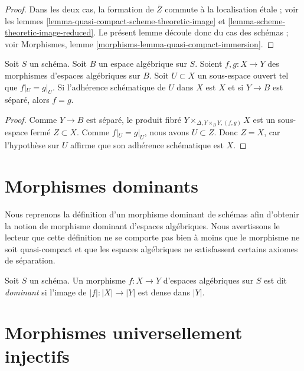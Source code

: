 \begin{proof}
Dans les deux cas, la formation de $\overline{Z}$ commute à la
localisation étale ; voir les lemmes
\ref{lemma-quasi-compact-scheme-theoretic-image} et
\ref{lemma-scheme-theoretic-image-reduced}.
Le présent lemme découle donc du cas des schémas ; voir
Morphismes, lemme \ref{morphisms-lemma-quasi-compact-immersion}.
\end{proof}

\begin{lemma}
\label{lemma-equality-of-morphisms}
Soit $S$ un schéma. Soit $B$ un espace algébrique sur $S$.
Soient $f, g : X \to Y$ des morphismes d'espaces algébriques sur $B$.
Soit $U \subset X$ un sous-espace ouvert tel que
$f|_U = g|_U$. Si l'adhérence schématique de $U$
dans $X$ est $X$ et si $Y \to B$ est séparé, alors $f = g$.
\end{lemma}

\begin{proof}
Comme $Y \to B$ est séparé, le produit fibré
$Y \times_{\Delta, Y \times_B Y, (f, g)} X$ est un sous-espace fermé $Z \subset X$. 
Comme $f|_U = g|_U$, nous avons $U \subset Z$. Donc $Z = X$,
car l'hypothèse sur $U$ affirme que son adhérence schématique est $X$.
\end{proof}






\section{Morphismes dominants}
\label{section-dominant}

\noindent
Nous reprenons la définition d'un morphisme dominant de schémas afin d'obtenir
la notion de morphisme dominant d'espaces algébriques. Nous avertissons le
lecteur que cette définition ne se comporte pas bien à moins que le morphisme
ne soit quasi-compact et que les espaces algébriques ne satisfassent certains
axiomes de séparation.

\begin{definition}
\label{definition-dominant}
Soit $S$ un schéma. Un morphisme $f : X \to Y$ d'espaces algébriques sur $S$ est
dit {\it dominant} si l'image de $|f| : |X| \to |Y|$ est dense dans $|Y|$.
\end{definition}






\section{Morphismes universellement injectifs}
\label{section-universally-injective}

